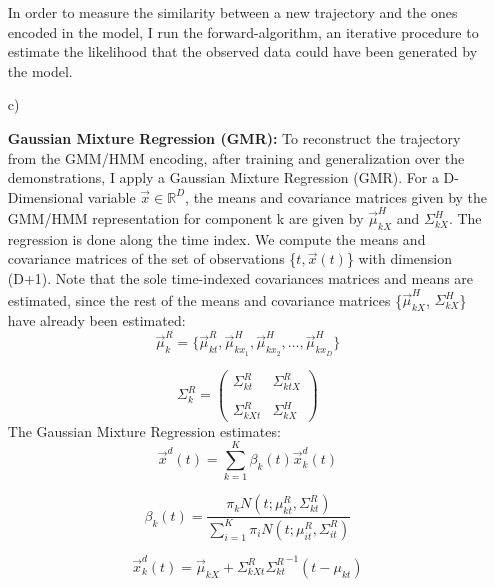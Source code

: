 \documentclass[conference]{IEEEtran}
\begin{document}
\begin{itemize}
{    In order to measure the similarity between a new trajectory and the ones encoded in the model, I run the forward-algorithm, an iterative procedure to estimate the likelihood that the observed data could have been generated by the model.
}
\\
\item[c)]{
    \textbf{Gaussian Mixture Regression (GMR):} To reconstruct the trajectory from the GMM/HMM encoding, after training and generalization over the demonstrations, I apply a Gaussian Mixture Regression (GMR). For a D-Dimensional variable $\vec{x} \in \mathbb{R}^{D}$, the means and covariance matrices given by the GMM/HMM representation for component k are given by $\vec{\mu}_{kX}^{H}$ and ${\Sigma}_{kX}^{H}$. The regression is done along the time index. We compute the means and covariance matrices of the set of observations \{$t, \vec{x}(t)$\} with dimension (D+1). Note that the sole time-indexed covariances matrices and means are estimated, since the rest of the means and covariance matrices \{$\vec{\mu}_{kX}^{H}$, ${\Sigma}_{kX}^{H}$\} have already been estimated:
    \begin{equation}
        \vec{\mu}_{k}^{R} = \{\vec{\mu}_{kt}^{R}, \vec{\mu}_{kx_{1}}^{H}, \vec{\mu}_{kx_{2}}^{H}, \dots, \vec{\mu}_{kx_{D}}^{H}\}
    \end{equation}

    \begin{equation}
        {\Sigma}_{k}^{R} = \begin{pmatrix} {\Sigma}_{kt}^{R}&{\Sigma}_{ktX}^{R}\\ \\ {\Sigma}_{kXt}^{R}&{\Sigma}_{kX}^{H} \end{pmatrix}
    \end{equation}
    The Gaussian Mixture Regression estimates:
    \begin{equation}
        \vec{x}^{d}(t) = \sum_{k=1}^{K} \beta_{k}(t)\vec{x}_{k}^{d}(t)
    \end{equation}

    \begin{equation}
        \beta_{k}(t) = \frac{\pi_{k}N(t;\mu_{kt}^{R},\Sigma_{kt}^{R})}{\sum_{i=1}^{K}\pi_{i}N(t;\mu_{it}^{R},\Sigma_{it}^{R})}
    \end{equation}

    \begin{equation}
        \vec{x}_{k}^{d}(t) = \vec{\mu}_{kX} + {\Sigma}_{kXt}^{R} {{\Sigma}_{kt}^{R}}^{-1} (t - \mu_{kt})
    \end{equation}

}
\end{itemize}
\end{document}
